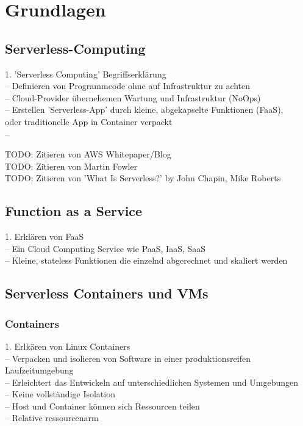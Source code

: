 \chapter{Grundlagen}

\section{Serverless-Computing}
1. 'Serverless Computing' Begriffserklärung\\
-- Definieren von Programmcode ohne auf Infrastruktur zu achten\\
-- Cloud-Provider übernehemen Wartung und Infrastruktur (NoOps)\\
-- Erstellen 'Serverless-App' durch kleine, abgekapselte Funktionen (FaaS),\\
oder traditionelle App in Container verpackt\\
--

TODO: Zitieren von AWS Whitepaper/Blog\\
TODO: Zitieren von Martin Fowler\\
TODO: Zitieren von 'What Is Serverless?' by John Chapin, Mike Roberts\\


\section{Function as a Service}
1. Erklären von FaaS\\
-- Ein Cloud Computing Service wie PaaS, IaaS, SaaS\\
-- Kleine, stateless Funktionen die einzelnd abgerechnet und skaliert werden\\


\section{Serverless Containers und VMs}
\subsection{Containers}
1. Erlkären von Linux Containers\\
-- Verpacken und isolieren von Software in einer produktionsreifen Laufzeitumgebung\\
-- Erleichtert das Entwickeln auf unterschiedlichen Systemen und Umgebungen\\
-- Keine vollständige Isolation\\
-- Host und Container können sich Ressourcen teilen\\
-- Relative ressourcenarm\\

